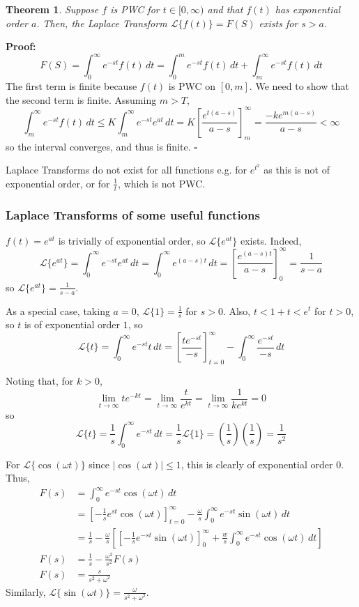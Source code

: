 \documentclass[11pt]{article}
\newtheorem{thm}{Theorem}[section]
\newcommand{\lap}{\mathcal{L}}
\newcommand{\intzi}{\int_0^{\infty}}
\begin{document}
	\begin{thm}
		Suppose $f$ is PWC for $t \in [0, \infty)$ and that $f(t)$ has exponential order $a$. Then, the Laplace Transform $\lap \{f(t) \} = F(S)$ exists for $s > a$.
	\end{thm}

	\textbf{Proof:}
		$$ F(S) = \intzi e^{-st} f(t) \,dt = \int_0^m e^{-st} f(t) \, dt + \int_m^{\infty} e^{-st} f(t) \, dt $$
	The first term is finite because $f(t)$ is PWC on $[0,m]$. We need to show that the second term is finite. Assuming $m > T$,
		$$ \int_m^{\infty} e^{-st} f(t) \, dt \leq K \int_m^{\infty} e^{-st} e^{at} \, dt = K \left[\frac{e^{t(a-s)}}{a-s}\right]_m^{\infty} = \frac{-k e^{m(a-s)}}{a-s} < \infty $$
	so the interval converges, and thus is finite. $\square$

	Laplace Transforms do not exist for all functions e.g. for $e^{t^2}$ as this is not of exponential order, or for $\frac{1}{t}$, which is not PWC.

\subsubsection{Laplace Transforms of some useful functions}

	$f(t) = e^{at}$ is trivially of exponential order, so $\lap\{e^{at}\}$ exists. Indeed,
		$$ \lap\{e^{at}\} = \intzi e^{-st} e^{at} \,dt = \intzi e^{(a-s)t} \, dt = \left[\frac{e^{(a-s)t}}{a-s}\right]_0^{\infty} = \frac{1}{s-a} $$
	so $\lap\{e^{at}\} = \frac{1}{s-a}$.

	As a special case, taking $a=0$, $\lap\{1\} = \frac{1}{s}$ for $s > 0$. Also, $t < 1 + t < e^t$ for $t > 0$, so $t$ is of exponential order $1$, so
		$$ \lap\{t\} = \intzi e^{-st} t \, dt = \left[ \frac{t e^{-st}}{-s} \right]_{t=0}^{\infty} - \intzi \frac{e^{-st}}{-s}\,dt $$

	Noting that, for $k > 0$,
		$$ \lim_{t \to \infty} t e^{-kt} = \lim_{t \to \infty} \frac{t}{e^{kt}} = \lim_{t \to \infty} \frac{1}{k e^{kt}} = 0 $$
	so
		$$ \lap\{t\} = \frac{1}{s} \intzi e^{-st}\,dt = \frac{1}{s} \lap\{1\} = \left(\frac{1}{s}\right) \left(\frac{1}{s}\right) = \frac{1}{s^2} $$

	For $\lap \{\cos(\omega t) \}$ since $|\cos(\omega t)| \leq 1$, this is clearly of exponential order $0$. Thus,
		\begin{align*}
			F(s) &= \intzi e^{-st} \cos(\omega t)\,dt \\
				&= \left[- \frac{1}{s} e^{st} \cos(\omega t)\right]_{t=0}^{\infty} - \frac{\omega}{s} \intzi e^{-st} \sin(\omega t)\,dt \\
				&= \frac{1}{s} - \frac{\omega}{s} \left[ \left[ - \frac{1}{s} e^{-st} \sin(\omega t)\right]_0^{\infty} + \frac{w}{s} \intzi e^{-st} \cos(\omega t)\,dt \right] \\
			F(s) &= \frac{1}{s} - \frac{\omega^2}{s^2} F(s) \\
			F(s) &= \frac{s}{s^2 + \omega^2}
		\end{align*}
	Similarly, $\lap\{\sin(\omega t)\} = \frac{\omega}{s^2 + \omega^2}$.
\end{document}
